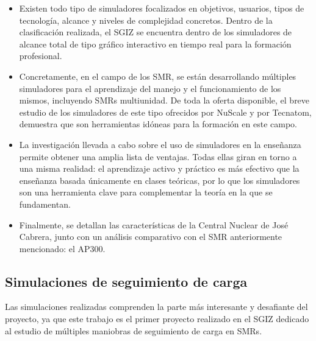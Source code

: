 \documentclass[a4paper, 11pt, spanish, twoside]{article}
\begin{document}
\begin{itemize}
    \item Existen todo tipo de simuladores focalizados en objetivos, usuarios, tipos de tecnología, alcance y niveles de complejidad concretos. Dentro de la clasificación realizada, el SGIZ se encuentra dentro de los simuladores de alcance total de tipo gráfico interactivo en tiempo real para la formación profesional.
    \item Concretamente, en el campo de los SMR, se están desarrollando múltiples simuladores para el aprendizaje del manejo y el funcionamiento de los mismos, incluyendo SMRs multiunidad. De toda la oferta disponible, el breve estudio de los simuladores de este tipo ofrecidos por NuScale y por Tecnatom, demuestra que son herramientas idóneas para la formación en este campo.
    \item La investigación llevada a cabo sobre el uso de simuladores en la enseñanza permite obtener una amplia lista de ventajas. Todas ellas giran en torno a una misma realidad: el aprendizaje activo y práctico es más efectivo que la enseñanza basada únicamente en clases teóricas, por lo que los simuladores son una herramienta clave para complementar la teoría en la que se fundamentan.
    \item Finalmente, se detallan las características de la Central Nuclear de José Cabrera, junto con un análisis comparativo con el SMR anteriormente mencionado: el AP300.
\end{itemize}


\subsection*{Simulaciones de seguimiento de carga}

Las simulaciones realizadas comprenden la parte más interesante y desafiante del proyecto, ya que este trabajo es el primer proyecto realizado en el SGIZ dedicado al estudio de múltiples maniobras de seguimiento de carga en SMRs.
\end{document}
